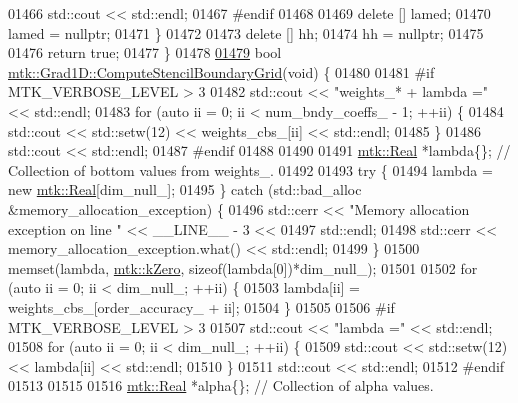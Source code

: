 \begin{DoxyCode}
{{01466     std::cout << std::endl;
01467 \textcolor{preprocessor}{    #endif}
01468 
01469     \textcolor{keyword}{delete} [] lamed;
01470     lamed = \textcolor{keyword}{nullptr};
01471   \}
01472 
01473   \textcolor{keyword}{delete} [] hh;
01474   hh = \textcolor{keyword}{nullptr};
01475 
01476   \textcolor{keywordflow}{return} \textcolor{keyword}{true};
01477 \}
01478 
\hypertarget{mtk__grad__1d_8cc_source_l01479}{}\hyperlink{classmtk_1_1Grad1D_a7ad1cecf6b52647263208ffaea0ee1e5}{01479} \textcolor{keywordtype}{bool} \hyperlink{classmtk_1_1Grad1D_a7ad1cecf6b52647263208ffaea0ee1e5}{mtk::Grad1D::ComputeStencilBoundaryGrid}(\textcolor{keywordtype}{void}) \{
01480 
01481 \textcolor{preprocessor}{  #if MTK\_VERBOSE\_LEVEL > 3}
01482   std::cout << \textcolor{stringliteral}{"weights\_* + lambda ="} << std::endl;
01483   \textcolor{keywordflow}{for} (\textcolor{keyword}{auto} ii = 0; ii < num\_bndy\_coeffs\_ - 1; ++ii) \{
01484     std::cout << std::setw(12) << weights\_cbs\_[ii] << std::endl;
01485   \}
01486   std::cout << std::endl;
01487 \textcolor{preprocessor}{  #endif}
01488 
01490 
01491   \hyperlink{group__c01-roots_gac080bbbf5cbb5502c9f00405f894857d}{mtk::Real} *lambda\{\}; \textcolor{comment}{// Collection of bottom values from weights\_.}
01492 
01493   \textcolor{keywordflow}{try} \{
01494     lambda = \textcolor{keyword}{new} \hyperlink{group__c01-roots_gac080bbbf5cbb5502c9f00405f894857d}{mtk::Real}[dim\_null\_];
01495   \} \textcolor{keywordflow}{catch} (std::bad\_alloc &memory\_allocation\_exception) \{
01496     std::cerr << \textcolor{stringliteral}{"Memory allocation exception on line "} << \_\_LINE\_\_ - 3 <<
01497       std::endl;
01498     std::cerr << memory\_allocation\_exception.what() << std::endl;
01499   \}
01500   memset(lambda, \hyperlink{group__c01-roots_ga59a451a5fae30d59649bcda274fea271}{mtk::kZero}, \textcolor{keyword}{sizeof}(lambda[0])*dim\_null\_);
01501 
01502   \textcolor{keywordflow}{for} (\textcolor{keyword}{auto} ii = 0; ii < dim\_null\_; ++ii) \{
01503     lambda[ii] = weights\_cbs\_[order\_accuracy\_ + ii];
01504   \}
01505 
01506 \textcolor{preprocessor}{  #if MTK\_VERBOSE\_LEVEL > 3}
01507   std::cout << \textcolor{stringliteral}{"lambda ="} << std::endl;
01508   \textcolor{keywordflow}{for} (\textcolor{keyword}{auto} ii = 0; ii < dim\_null\_; ++ii) \{
01509     std::cout << std::setw(12) << lambda[ii] << std::endl;
01510   \}
01511   std::cout << std::endl;
01512 \textcolor{preprocessor}{  #endif}
01513 
01515 
01516   \hyperlink{group__c01-roots_gac080bbbf5cbb5502c9f00405f894857d}{mtk::Real} *alpha\{\}; \textcolor{comment}{// Collection of alpha values.}
}}
\end{DoxyCode}
